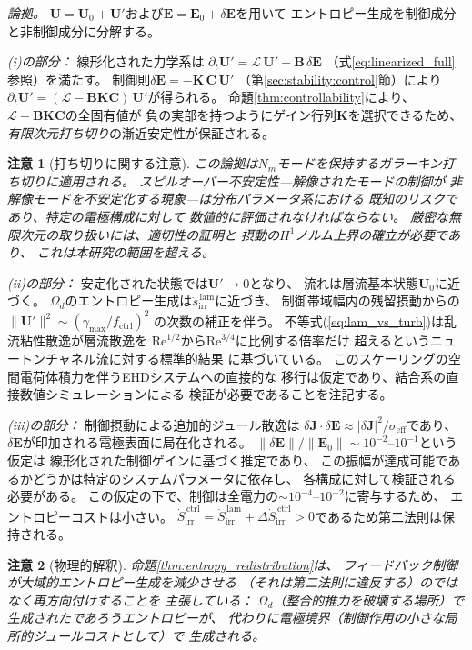\documentclass[12pt,twocolumn]{ltjsarticle}
\newtheorem{remark}{注意}
\newcommand{\ee}{\mathbf{E}}
\newcommand{\jj}{\mathbf{J}}
\newcommand{\uu}{\mathbf{U}}
\newcommand{\kk}{\mathbf{K}}
\newcommand{\Lop}{\mathcal{L}}
\newcommand{\Sdot}{\dot{S}_{\mathrm{irr}}}
\newcommand{\sdot}{\dot{s}_{\mathrm{irr}}}
\begin{document}
\textit{論拠。}
$\uu = \uu_0 + \uu'$および$\ee = \ee_0 + \delta\ee$を用いて
エントロピー生成を制御成分と非制御成分に分解する。

\textit{(i)の部分：} 線形化された力学系は
$\partial_t \uu' = \Lop\,\uu' + \mathbf{B}\,\delta\ee$
（式\ref{eq:linearized_full}参照）を満たす。
制御則$\delta\ee = -\kk\,\mathbf{C}\,\uu'$
（第\ref{sec:stability:control}節）により
$\partial_t \uu' = (\Lop - \mathbf{B}\kk\mathbf{C})\,\uu'$が得られる。
命題\ref{thm:controllability}により、
$\Lop - \mathbf{B}\kk\mathbf{C}$の全固有値が
負の実部を持つようにゲイン行列$\kk$を選択できるため、
\emph{有限次元打ち切り}の漸近安定性が保証される。

\begin{remark}[打ち切りに関する注意]
この論拠は$N_m$モードを保持するガラーキン打ち切りに適用される。
スピルオーバー不安定性---解像されたモードの制御が
非解像モードを不安定化する現象---は分布パラメータ系における
既知のリスクであり、特定の電極構成に対して
数値的に評価されなければならない。
厳密な無限次元の取り扱いには、適切性の証明と
摂動の$H^1$ノルム上界の確立が必要であり、
これは本研究の範囲を超える。
\end{remark}

\textit{(ii)の部分：} 安定化された状態では$\uu' \to 0$となり、
流れは層流基本状態$\uu_0$に近づく。
$\Omega_d$のエントロピー生成は$\sdot^{\,\mathrm{lam}}$に近づき、
制御帯域幅内の残留摂動からの$\|\uu'\|^2 \sim (\gamma_{\max}/f_{\mathrm{ctrl}})^2$
の次数の補正を伴う。
不等式(\ref{eq:lam_vs_turb})は乱流粘性散逸が層流散逸を
$\mathrm{Re}^{1/2}$から$\mathrm{Re}^{3/4}$に比例する倍率だけ
超えるというニュートンチャネル流に対する標準的結果
\cite{Pope2000}に基づいている。
このスケーリングの空間電荷体積力を伴うEHDシステムへの直接的な
移行は仮定であり、結合系の直接数値シミュレーションによる
検証が必要であることを注記する。

\textit{(iii)の部分：} 制御摂動による追加的ジュール散逸は
$\delta\jj \cdot \delta\ee \approx
|\delta\jj|^2 / \sigma_{\mathrm{eff}}$であり、
$\delta\ee$が印加される電極表面に局在化される。
$\|\delta\ee\| / \|\ee_0\| \sim 10^{-2}$--$10^{-1}$という仮定は
線形化された制御ゲインに基づく推定であり、
この振幅が達成可能であるかどうかは特定のシステムパラメータに依存し、
各構成に対して検証される必要がある。
この仮定の下で、制御は全電力の$\sim 10^{-4}$--$10^{-2}$に寄与するため、
エントロピーコストは小さい。
$\Sdot^{\,\mathrm{ctrl}} = \Sdot^{\,\mathrm{lam}} +
\Delta\Sdot^{\,\mathrm{ctrl}} > 0$であるため第二法則は保持される。

\begin{remark}[物理的解釈]
命題\ref{thm:entropy_redistribution}は、
フィードバック制御が大域的エントロピー生成を\emph{減少}させる
（それは第二法則に違反する）のではなく\emph{再方向付け}することを
主張している：
$\Omega_d$（整合的推力を破壊する場所）で生成されたであろうエントロピーが、
代わりに電極境界（制御作用の小さな局所的ジュールコストとして）で
生成される。
\end{remark}
\end{document}
